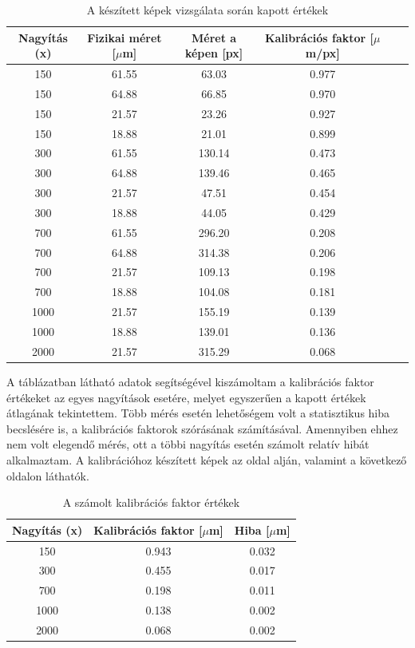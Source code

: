 \documentclass[12pt,a4paper]{article}
\begin{document}
\begin{table}[!h]
\begin{center}
\hspace*{-0.7cm}
\begin{tabular}{|c|c|c|c|c|c|}
\hline
Nagyítás (x) & Fizikai méret [$\mu$m]& Méret a képen [px] & Kalibrációs faktor [$\mu$m/px] \\
\hline
150 & 61.55 & 63.03 & 0.977\\
\hline
150 & 64.88 & 66.85 & 0.970\\
\hline
150 & 21.57 & 23.26 & 0.927\\
\hline
150 & 18.88 & 21.01 & 0.899\\
\hline
300 & 61.55 & 130.14 & 0.473\\
\hline
300 & 64.88 & 139.46 & 0.465\\
\hline
300 & 21.57 & 47.51 & 0.454\\
\hline
300 & 18.88 & 44.05 & 0.429\\
\hline
700 & 61.55 & 296.20 & 0.208\\
\hline
700 & 64.88 & 314.38 & 0.206\\
\hline
700 & 21.57 & 109.13 & 0.198\\
\hline
700 & 18.88 & 104.08 & 0.181\\
\hline
1000 & 21.57 & 155.19 & 0.139\\
\hline
1000 & 18.88 & 139.01 & 0.136\\
\hline
2000 & 21.57 & 315.29 & 0.068\\
\hline
\end{tabular}
\caption{A készített képek vizsgálata során kapott értékek}
\label{tab:kalib}
\end{center}
\end{table}

\newpage

A táblázatban látható adatok segítségével kiszámoltam a kalibrációs faktor értékeket az egyes nagyítások esetére, melyet egyszerűen a kapott értékek átlagának tekintettem. Több mérés esetén lehetőségem volt a statisztikus hiba becslésére is, a kalibrációs faktorok szórásának számításával. Amennyiben ehhez nem volt elegendő mérés, ott a többi nagyítás esetén számolt relatív hibát alkalmaztam. A kalibrációhoz készített képek az oldal alján, valamint a következő oldalon láthatók.

\begin{table}[!h]
\begin{center}
\begin{tabular}{|c|c|c|}
\hline
Nagyítás (x) & Kalibrációs faktor [$\mu$m] & Hiba [$\mu$m]\\
\hline
150 & 0.943 & 0.032 \\
\hline
300 & 0.455 & 0.017 \\
\hline
700 & 0.198 & 0.011 \\
\hline
1000 & 0.138 & 0.002 \\
\hline
2000 & 0.068 & 0.002 \\
\hline
\end{tabular}
\caption{A számolt kalibrációs faktor értékek}
\label{tab:kalibs}
\end{center}
\end{table}
\end{document}
